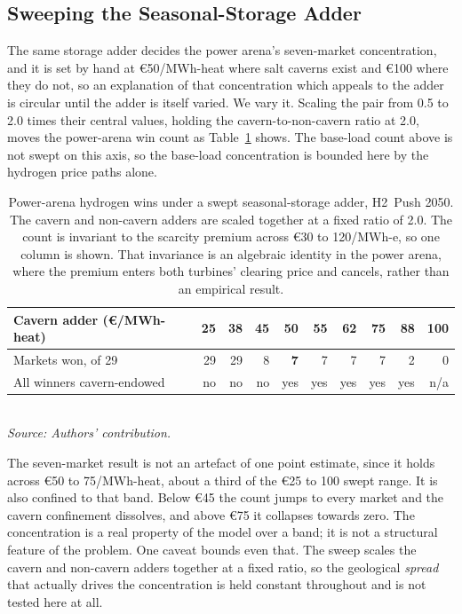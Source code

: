 \subsection{Sweeping the Seasonal-Storage Adder}
\label{sec:sensitivity:sigma}

The same
storage adder decides the power arena's seven-market concentration, and it is
set by hand at \euro{}50/MWh-heat where salt caverns exist and \euro{}100 where they do
not, so an explanation of that concentration which appeals to the adder is circular
until the adder is itself varied. We vary it. Scaling the pair from 0.5 to 2.0 times
their central values, holding the cavern-to-non-cavern ratio at 2.0, moves the
power-arena win count as Table~\ref{tab:sigma_sweep} shows. The base-load count above is
not swept on this axis, so the base-load concentration is bounded here by the hydrogen
price paths alone.

\begin{table}[H]
\centering
\caption{Power-arena hydrogen wins under a swept seasonal-storage adder, H2~Push 2050.
The cavern and non-cavern adders are scaled together at a fixed ratio of 2.0. The count is invariant to the scarcity premium across \euro{}30 to 120/MWh-e, so one
column is shown. That invariance is an algebraic identity in the power arena, where the
premium enters both turbines' clearing price and cancels, rather than an empirical
result.}
\label{tab:sigma_sweep}
\small
\begin{tabular}{lrrrrrrrrr}
\toprule
Cavern adder (\euro{}/MWh-heat) & 25 & 38 & 45 & \textbf{50} & 55 & 62 & 75 & 88 & 100 \\
\midrule
Markets won, of 29              & 29 & 29 &  8 & \textbf{7}  &  7 &  7 &  7 &  2 &  0 \\
All winners cavern-endowed      & no & no & no & yes         & yes& yes& yes& yes& n/a \\
\bottomrule
\end{tabular}
\\[8pt]{\footnotesize\textit{Source: Authors' contribution.}}
\end{table}

The seven-market result is not an artefact of one point estimate, since it holds across
\euro{}50 to 75/MWh-heat, about a third of the \euro{}25 to 100 swept range. It is also
confined to that band. Below
\euro{}45 the count jumps to every market and the cavern confinement dissolves, and
above \euro{}75 it collapses towards zero. The concentration is a real property of the
model over a band; it is not a structural feature of the problem. One caveat bounds even that. The sweep scales the cavern
and non-cavern adders together at a fixed ratio, so the geological \emph{spread} that
actually drives the concentration is held constant throughout and is not tested here at all.

